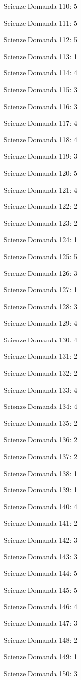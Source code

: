 \documentclass[20pt, a4paper]{article}
\begin{document}
\begin{itemize}[leftmargin=*]
\item [Scienze] Domanda 110: 5
\item [Scienze] Domanda 111: 5
\item [Scienze] Domanda 112: 5
\item [Scienze] Domanda 113: 1
\item [Scienze] Domanda 114: 4
\item [Scienze] Domanda 115: 3
\item [Scienze] Domanda 116: 3
\item [Scienze] Domanda 117: 4
\item [Scienze] Domanda 118: 4
\item [Scienze] Domanda 119: 3
\item [Scienze] Domanda 120: 5
\item [Scienze] Domanda 121: 4
\item [Scienze] Domanda 122: 2
\item [Scienze] Domanda 123: 2
\item [Scienze] Domanda 124: 1
\item [Scienze] Domanda 125: 5
\item [Scienze] Domanda 126: 3
\item [Scienze] Domanda 127: 1
\item [Scienze] Domanda 128: 3
\item [Scienze] Domanda 129: 4
\item [Scienze] Domanda 130: 4
\item [Scienze] Domanda 131: 2
\item [Scienze] Domanda 132: 2
\item [Scienze] Domanda 133: 4
\item [Scienze] Domanda 134: 4
\item [Scienze] Domanda 135: 2
\item [Scienze] Domanda 136: 2
\item [Scienze] Domanda 137: 2
\item [Scienze] Domanda 138: 1
\item [Scienze] Domanda 139: 1
\item [Scienze] Domanda 140: 4
\item [Scienze] Domanda 141: 2
\item [Scienze] Domanda 142: 3
\item [Scienze] Domanda 143: 3
\item [Scienze] Domanda 144: 5
\item [Scienze] Domanda 145: 5
\item [Scienze] Domanda 146: 4
\item [Scienze] Domanda 147: 3
\item [Scienze] Domanda 148: 2
\item [Scienze] Domanda 149: 1
\item [Scienze] Domanda 150: 3
\end{itemize}
\end{document}
